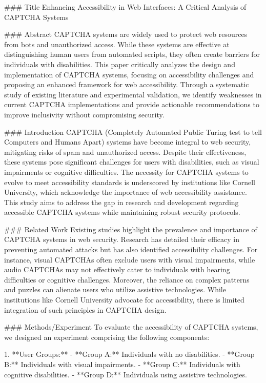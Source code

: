 ### Title  
Enhancing Accessibility in Web Interfaces: A Critical Analysis of CAPTCHA Systems  

### Abstract  
CAPTCHA systems are widely used to protect web resources from bots and unauthorized access. While these systems are effective at distinguishing human users from automated scripts, they often create barriers for individuals with disabilities. This paper critically analyzes the design and implementation of CAPTCHA systems, focusing on accessibility challenges and proposing an enhanced framework for web accessibility. Through a systematic study of existing literature and experimental validation, we identify weaknesses in current CAPTCHA implementations and provide actionable recommendations to improve inclusivity without compromising security.  

### Introduction  
CAPTCHA (Completely Automated Public Turing test to tell Computers and Humans Apart) systems have become integral to web security, mitigating risks of spam and unauthorized access. Despite their effectiveness, these systems pose significant challenges for users with disabilities, such as visual impairments or cognitive difficulties. The necessity for CAPTCHA systems to evolve to meet accessibility standards is underscored by institutions like Cornell University, which acknowledge the importance of web accessibility assistance. This study aims to address the gap in research and development regarding accessible CAPTCHA systems while maintaining robust security protocols.  

### Related Work  
Existing studies highlight the prevalence and importance of CAPTCHA systems in web security. Research has detailed their efficacy in preventing automated attacks but has also identified accessibility challenges. For instance, visual CAPTCHAs often exclude users with visual impairments, while audio CAPTCHAs may not effectively cater to individuals with hearing difficulties or cognitive challenges. Moreover, the reliance on complex patterns and puzzles can alienate users who utilize assistive technologies. While institutions like Cornell University advocate for accessibility, there is limited integration of such principles in CAPTCHA design.  

### Methods/Experiment  
To evaluate the accessibility of CAPTCHA systems, we designed an experiment comprising the following components:  

1. **User Groups:**  
   - **Group A:** Individuals with no disabilities.  
   - **Group B:** Individuals with visual impairments.  
   - **Group C:** Individuals with cognitive disabilities.  
   - **Group D:** Individuals using assistive technologies.  

